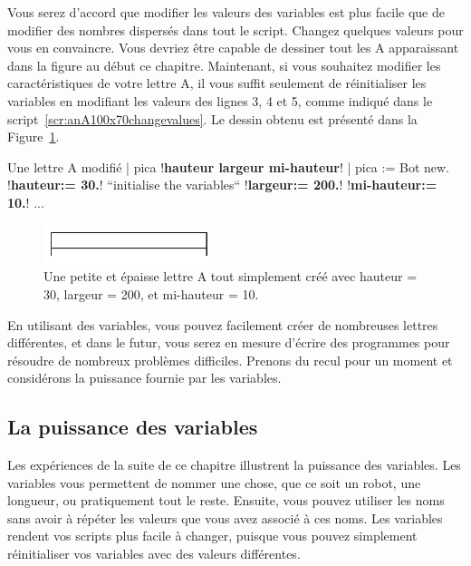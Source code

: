 \documentclass[a4paper,10pt,twoside]{book}
\begin{document}
Vous serez d'accord que modifier les valeurs des variables est plus facile que de modifier des nombres dispers\'es dans tout le script. Changez quelques valeurs pour vous en convaincre. Vous devriez \^etre capable de dessiner tout les A apparaissant dans la figure au d\'ebut ce chapitre. Maintenant, si vous souhaitez modifier les caract\'eristiques de votre lettre A, il vous suffit seulement de r\'einitialiser les variables en modifiant les valeurs des lignes 3, 4 et 5, comme indiqu\'e dans le script~\ref{scr:anA100x70changevalues}. Le dessin obtenu est pr\'esent\'e dans la Figure~\ref{fig:varaflat}. 

\begin{script}{Une lettre A modifi\'e}
| pica !\textbf{hauteur largeur mi-hauteur}! | 
pica := Bot new. 
!\textbf{hauteur:= 30.}!       ``initialise the variables`` 
!\textbf{largeur:= 200.}! 
!\textbf{mi-hauteur:= 10.}! 
... 
\end{script}


\begin{figure}[h!]
\centering\includegraphics[width=5cm]{varAFlat}
\caption{Une petite et \'epaisse lettre A tout simplement cr\'e\'e avec hauteur = 30, largeur = 200, et mi-hauteur = 10.\label{fig:varaflat}}
\end{figure}

En utilisant des variables, vous pouvez facilement cr\'eer de nombreuses lettres diff\'erentes, et dans le futur, vous serez en mesure d'\'ecrire des programmes pour r\'esoudre de nombreux probl\`emes difficiles. Prenons du recul pour un moment et consid\'erons la puissance fournie par les variables. 

\subsection{La puissance des variables }

Les exp\'eriences de la suite de ce chapitre illustrent la puissance des variables. Les variables vous permettent de nommer une chose, que ce soit un robot, une longueur, ou pratiquement tout le reste. Ensuite, vous pouvez utiliser les noms sans avoir \`a r\'ep\'eter les valeurs que vous avez associ\'e \`a ces noms. Les variables rendent vos scripts plus facile \`a changer, puisque vous pouvez simplement r\'einitialiser vos variables avec des valeurs diff\'erentes. 
\end{document}
